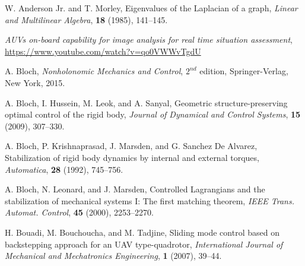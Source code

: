 \documentclass{aims}
\theoremstyle{definition}
\begin{document}
\begin{thebibliography}{99}

    \newblock W. Anderson Jr. and T. Morley,
    \newblock Eigenvalues of the Laplacian of a graph,
    \newblock \emph{Linear and Multilinear Algebra}, \textbf{18} (1985), 141--145.
    
    \newblock \emph{AUVs on-board capability for image analysis for real time situation assessment},
    \newblock \url{https://www.youtube.com/watch?v=qo0VWWvTgdU}

     \newblock A. Bloch,
     \newblock \emph{Nonholonomic Mechanics and Control}, $2^{nd}$ edition,
     \newblock Springer-Verlag, New York, 2015.

    \newblock A. Bloch, I. Hussein, M. Leok, and A. Sanyal,
    \newblock Geometric structure-preserving optimal control of the rigid body,
    \newblock \emph{Journal of Dynamical and Control Systems}, \textbf{15} (2009), 307--330.

     \newblock A. Bloch, P. Krishnaprasad, J. Marsden, and G. Sanchez De Alvarez,
     \newblock Stabilization of rigid body dynamics by internal and external torques,
     \newblock \emph{Automatica}, \textbf{28} (1992), 745--756.     

     
     \newblock A. Bloch, N. Leonard, and J. Marsden,
     \newblock Controlled Lagrangians and the stabilization of mechanical systems I: The first matching theorem,
     \newblock \emph{IEEE Trans. Automat. Control}, \textbf{45} (2000), 2253--2270.
     

     \newblock H. Bouadi, M. Bouchoucha, and M. Tadjine,
     \newblock Sliding mode control based on backstepping approach for an UAV type-quadrotor,
     \newblock \emph{International Journal of Mechanical and Mechatronics Engineering}, \textbf{1} (2007), 39--44.


\end{thebibliography}
\end{document}
